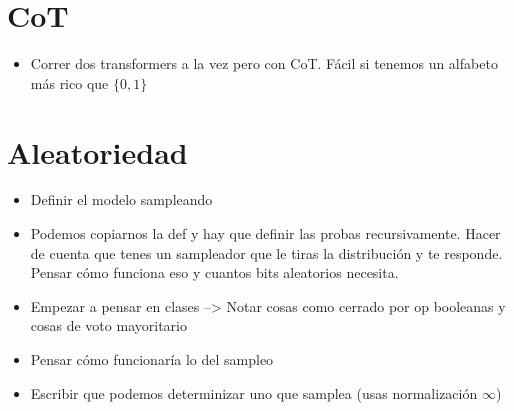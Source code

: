 \documentclass{article}
\begin{document}
\section{CoT}

\begin{itemize}
    \item Correr dos transformers a la vez pero con CoT. Fácil si tenemos un alfabeto más rico que $\{0,1\}$
\end{itemize}



\section{Aleatoriedad}
\begin{itemize}
    \item Definir el modelo sampleando
    \item Podemos copiarnos la def y hay que definir las probas recursivamente. Hacer de cuenta que tenes un sampleador que le tiras la distribución y te responde. Pensar cómo funciona eso y cuantos bits aleatorios necesita.
    \item Empezar a pensar en clases --> Notar cosas como cerrado por op booleanas y cosas de voto mayoritario
    \item Pensar cómo funcionaría lo del sampleo
    \item Escribir que podemos determinizar uno que samplea (usas normalización $\infty$)
\end{itemize}
\end{document}

